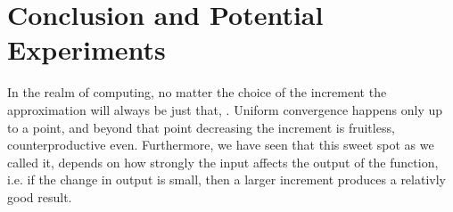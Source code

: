 \section{Conclusion and Potential Experiments}

In the realm of computing, no matter the choice of the increment the approximation will always be just that, . Uniform convergence happens only up to a point, and beyond that point decreasing the increment is fruitless, counterproductive even. Furthermore, we have seen that this sweet spot as we called it, depends on how strongly the input affects the output of the function, i.e. if the change in output is small, then a larger increment produces a relativly good result.